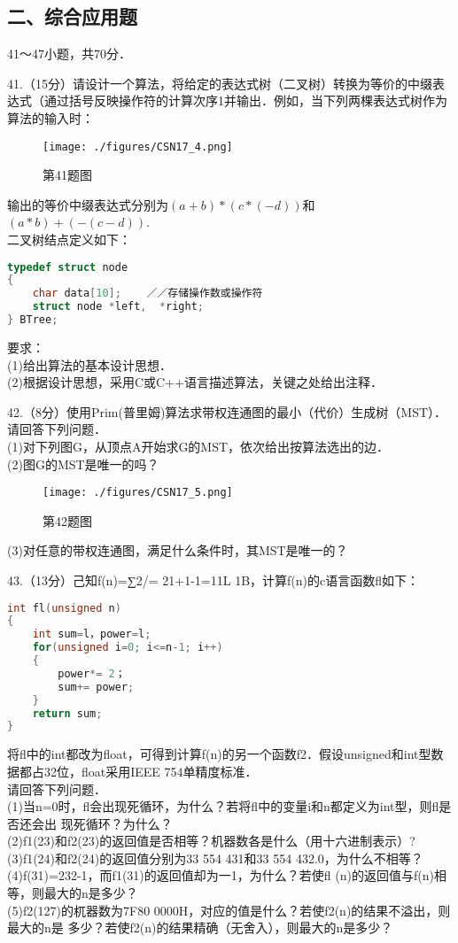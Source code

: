 \subsection{二、综合应用题}
41～47小题，共70分．

41.（15分）请设计一个算法，将给定的表达式树（二叉树）转换为等价的中缀表达式（通过括号反映操作符的计算次序1并输出．例如，当下列两棵表达式树作为算法的输入时：
\begin{figure}[ht]
\centering
\texttt{[image: ./figures/CSN17\_4.png]}
\caption{第41题图} \label{CSN17_fig4}
\end{figure}
输出的等价中缀表达式分别为$(a+b)*(c*(-d))$和$(a*b)+(-(c-d))$. \\
二叉树结点定义如下：
\begin{lstlisting}[language=cpp]
typedef struct node
{
    char data[10];    ／／存储操作数或操作符
    struct node *left,  *right;
} BTree;
\end{lstlisting}
要求： \\
(1)给出算法的基本设计思想． \\
(2)根据设计思想，采用C或C++语言描述算法，关键之处给出注释．

42.（8分）使用Prim(普里姆)算法求带权连通图的最小（代价）生成树（MST）．请回答下列问题． \\
(1)对下列图G，从顶点A开始求G的MST，依次给出按算法选出的边． \\
(2)图G的MST是唯一的吗？
\begin{figure}[ht]
\centering
\texttt{[image: ./figures/CSN17\_5.png]}
\caption{第42题图} \label{CSN17_fig5}
\end{figure}
(3)对任意的带权连通图，满足什么条件时，其MST是唯一的？

43.（13分）己知f(n)=∑2/= 21+1-1=11L 1B，计算f(n)的c语言函数fl如下： \\
\begin{lstlisting}[language=cpp]
int fl(unsigned n)
{
    int sum=l，power=l;
    for(unsigned i=0; i<=n-1; i++)
    {
        power*= 2；
        sum+= power;
    }
    return sum;
}
\end{lstlisting}
将fl中的int都改为float，可得到计算f(n)的另一个函数f2．假设unsigned和int型数据都占32位，float采用IEEE 754单精度标准． \\
请回答下列问题． \\
    (1)当n=0时，fl会出现死循环，为什么？若将fl中的变量i和n都定义为int型，则fl是否还会出
现死循环？为什么？ \\
    (2)f1(23)和f2(23)的返回值是否相等？机器数各是什么（用十六进制表示）? \\
    (3)f1(24)和f2(24)的返回值分别为33 554 431和33 554 432.0，为什么不相等？ \\
    (4)f(31)=232-1，而f1(31)的返回值却为一1，为什么？若使fl (n)的返回值与f(n)相等，则最大的n是多少？ \\
    (5)f2(127)的杌器数为7F80 0000H，对应的值是什么？若使f2(n)的结果不溢出，则最大的n是
多少？若使f2(n)的结果精确（无舍入），则最大的n是多少？

